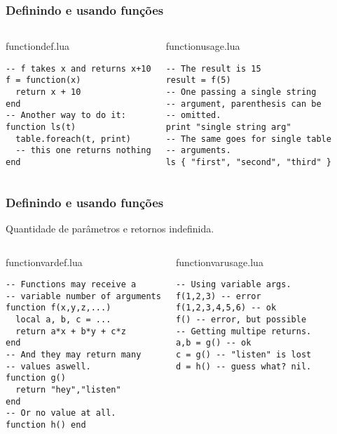 \documentclass[brazil]{beamer}
\begin{document}

\begin{frame}[fragile]
  \frametitle{Definindo e usando funções}
  \pause
  \begin{columns}
      \begin{block}{functiondef.lua}
        \begin{lstlisting}
-- f takes x and returns x+10
f = function(x)
  return x + 10
end
-- Another way to do it:
function ls(t)
  table.foreach(t, print)
  -- this one returns nothing
end
        \end{lstlisting}
      \end{block}
    \pause
      \begin{block}{functionusage.lua}
        \begin{lstlisting}
-- The result is 15
result = f(5)
-- One passing a single string
-- argument, parenthesis can be
-- omitted.
print "single string arg"
-- The same goes for single table
-- arguments.
ls { "first", "second", "third" }
        \end{lstlisting}
      \end{block}
  \end{columns}
\end{frame}


\begin{frame}[fragile]
  \frametitle{Definindo e usando funções}
  \pause
  \begin{center}
    Quantidade de parâmetros e retornos indefinida.
  \end{center}
  \pause
  \begin{columns}
      \begin{block}{functionvardef.lua}
        \begin{lstlisting}
-- Functions may receive a
-- variable number of arguments
function f(x,y,z,...)
  local a, b, c = ...
  return a*x + b*y + c*z
end
-- And they may return many
-- values aswell.
function g()
  return "hey","listen"
end
-- Or no value at all.
function h() end
        \end{lstlisting}
      \end{block}
    \pause
      \begin{block}{functionvarusage.lua}
        \begin{lstlisting}
-- Using variable args.
f(1,2,3) -- error
f(1,2,3,4,5,6) -- ok
f() -- error, but possible
-- Getting multipe returns.
a,b = g() -- ok
c = g() -- "listen" is lost
d = h() -- guess what? nil.
        \end{lstlisting}
      \end{block}
  \end{columns}
\end{frame}
\end{document}

